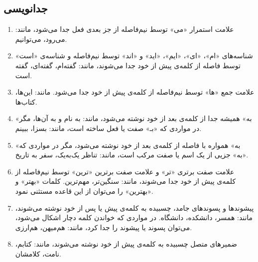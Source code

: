 \subsection{جدانویسی}
\begin{enumerate}
\item 
علامت استمرار «می» توسط نیم‌فاصله از جز بعدی فعل جدا می‌شود، مانند: می‌رود، می‌توانیم.
\item 
شناسه‌های «ام»، «ای»، «ایم»، «اید» و «اند» توسط نیم‌فاصله و شناسه‌ی «است» توسط فاصله از کلمه‌ی پیش از خود جدا می‌شوند، مانند: گفته‌ام، گفته‌ای، گفته است.
\item 
علامت جمع «ها» توسط نیم‌فاصله از کلمه‌ی پیش از خود جدا می‌شود. مانند: این‌ها، کتاب‌ها.
\item 
«به» همیشه جدا از کلمه‌ی بعد از خود نوشته می‌شود، مانند: به‌ نام و به آن‌ها، مگر در مواردی که «بـ» صفت یا فعل ساخته است، مانند: بسزا، ببینم.
\item 
«به» همواره با فاصله از کلمه‌ی بعد از خود نوشته می‌شود، مگر در مواردی که «به» جزیی از یک اسم یا صفت مرکب است، مانند: تناظر یک‌به‌یک، سفر به تاریخ. 
\item 
علامت صفت برتری «تر» و علامت صفت برترین «ترین» توسط نیم‌فاصله از کلمه‌ی پیش از خود جدا می‌شوند، مانند: سنگین‌تر، مهم‌ترین. کلمات «بهتر» و «بهترین» را می‌توان از این قاعده مستثنی نمود. 
\item 
پیشوندها و پسوندهای جامد، چسبیده به کلمه‌ی پیش یا پس از خود نوشته می‌شوند، مانند: همسر، دانشکده، دانشگاه. در مواردی که خواندن کلمه دچار اشکال می‌شود، می‌توان پسوند یا پیشوند را جدا کرد، مانند: هم‌میهن، هم‌ارزی. 
\item 
ضمیرهای متصل چسبیده به کلمه‌ی پیش‌ از خود نوشته می‌شوند، مانند: کتابم، نامت، کلامشان. 
\end{enumerate}
